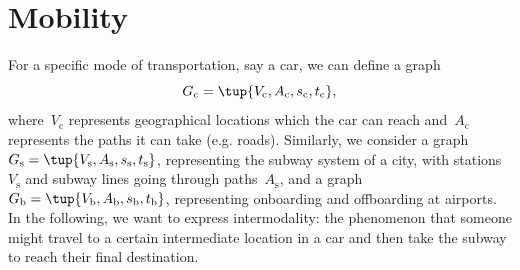 %
%
%

\section{Mobility}

For a specific mode of transportation, say a car, we can define a graph
\begin{equation*}
  G_\mathrm{c}=\tup{V_\mathrm{c},A_\mathrm{c},s_\mathrm{c},t_\mathrm{c}},
\end{equation*}
where~$V_\mathrm{c}$ represents geographical locations which the car can reach and~$A_\mathrm{c}$ represents the paths it can take (e.g. roads). Similarly, we consider a graph~$G_\mathrm{s}=\tup{V_\mathrm{s},A_\mathrm{s},s_\mathrm{s},t_\mathrm{s}}$, representing the subway system of a city, with stations~$V_\mathrm{s}$ and subway lines going through paths~$A_\mathrm{s}$, and a graph $G_\mathrm{b}=\tup{V_\mathrm{b},A_\mathrm{b},s_\mathrm{b},t_\mathrm{b}}$, representing onboarding and offboarding at airports. In the following, we want to express intermodality: the phenomenon that someone might travel to a certain intermediate location in a car and then take the subway to reach their final destination.

